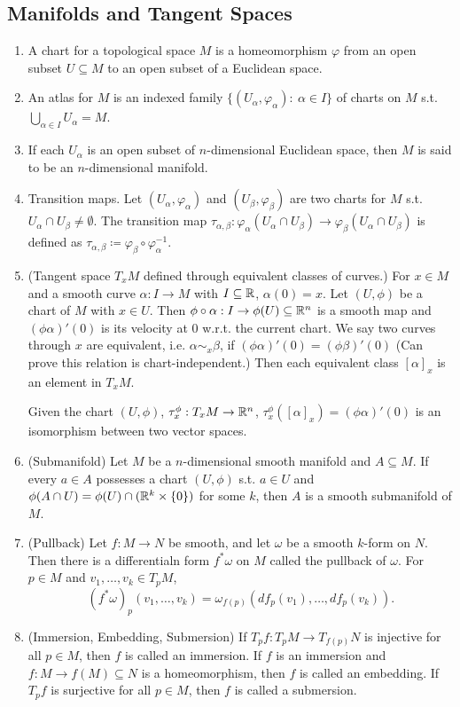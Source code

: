 \subsection{Manifolds and Tangent Spaces}
\label{sec:manifolds}
\begin{enumerate}
    \item A chart for a topological space $M$ is a homeomorphism $\varphi$ from an open subset $U \subseteq M$ to an open subset of a Euclidean space. 
    \item An atlas for $M$ is an indexed family $\{(U_\alpha, \varphi_\alpha):\ \alpha\in I\}$ of charts on $M$ s.t. $\bigcup_{\alpha \in I} U_\alpha=M$.
    \item If each $U_\alpha$ is an open subset of $n$-dimensional Euclidean space, then $M$ is said to be an $n$-dimensional manifold.
    \item Transition maps. Let $(U_\alpha, \varphi_\alpha)$ and $(U_\beta, \varphi_\beta)$ are two charts for $M$ s.t. $U_\alpha \cap U_\beta \neq \emptyset$. The transition map $\tau_{\alpha,\beta}: \varphi_\alpha(U_\alpha \cap U_\beta) \to \varphi_\beta (U_\alpha \cap U_\beta)$ is defined as $\tau_{\alpha,\beta} \coloneqq \varphi_\beta \circ \varphi_\alpha^{-1}$.
    \item (Tangent space $T_x M$ defined through equivalent classes of curves.) For $x\in M$ and a smooth curve $\alpha: I \to M$ with $I\subseteq \mathbb{R}$, $\alpha(0)=x$. Let $(U,\phi)$ be a chart of $M$ with $x\in U$. Then $\phi \circ \alpha: I \to \phi(U) \subseteq\mathbb{R}^n$ is a smooth map and $(\phi \alpha)'(0)$ is its velocity at $0$ w.r.t. the current chart. We say two curves through $x$ are equivalent, i.e. $\alpha \sim_x \beta$, if $(\phi\alpha)'(0)=(\phi\beta)'(0)$ (Can prove this relation is chart-independent.) Then each equivalent class $[\alpha]_x$ is an element in $T_xM$. \cite[Definition~C.5.1]{Helmke_1994_optim}
    
    Given the chart $(U,\phi)$, $\tau^\phi_x: T_x M \to \mathbb{R}^n$, $\tau^\phi_x([\alpha]_x)=(\phi\alpha)'(0)$ is an isomorphism between two vector spaces.
    \item (Submanifold) Let $M$ be a $n$-dimensional smooth manifold and $A \subseteq M$. If every $a\in A$ possesses a chart $(U, \phi)$ s.t. $a \in U$ and $\phi(A \cap U) = \phi(U) \cap (\mathbb{R}^k \times \{0\})$ for some $k$, then $A$ is a smooth submanifold of $M$. 
    \item (Pullback) Let $f:M \to N$ be smooth, and let $\omega$ be a smooth $k$-form on $N$. Then there is a differentialn form $f^* \omega$ on $M$ called the pullback of $\omega$. For $p\in M$ and $v_1,\dots,v_k \in T_p M$, 
    \[ (f^* \omega)_p (v_1,\dots,v_k) =\omega_{f(p)} (df_p(v_1),\dots, df_p(v_k)). \]
    \item (Immersion, Embedding, Submersion) If $T_p f: T_p M \to T_{f(p)}N$ is injective for all $p\in M$, then $f$ is called an immersion. If $f$ is an immersion and $f:M \to f(M) \subseteq N$ is a homeomorphism, then $f$ is called an embedding. If $T_p f$ is surjective for all $p\in M$, then $f$ is called a submersion.
\end{enumerate}

